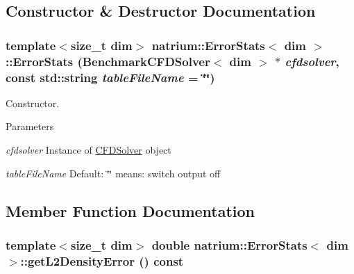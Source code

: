 \subsection{Constructor \& Destructor Documentation}
\hypertarget{classnatrium_1_1ErrorStats_a1dcdc9cb0508c7f64a067efae4134754}{
\subsubsection[{ErrorStats}]{\setlength{\rightskip}{0pt plus 5cm}template$<$size\_\-t dim$>$ {\bf natrium::ErrorStats}$<$ dim $>$::{\bf ErrorStats} ({\bf BenchmarkCFDSolver}$<$ dim $>$ $\ast$ {\em cfdsolver}, \/  const std::string {\em tableFileName} = {\ttfamily \char`\"{}\char`\"{}})}}
\label{classnatrium_1_1ErrorStats_a1dcdc9cb0508c7f64a067efae4134754}


Constructor. 
\begin{DoxyParams}{Parameters}
\item[{\em cfdsolver}]Instance of \hyperlink{classnatrium_1_1CFDSolver}{CFDSolver} object \item[{\em tableFileName}]Default: \char`\"{}\char`\"{} means: switch output off \end{DoxyParams}


\subsection{Member Function Documentation}
\hypertarget{classnatrium_1_1ErrorStats_a66f817c7daaf15724d5d42de4f17a1e8}{
\subsubsection[{getL2DensityError}]{\setlength{\rightskip}{0pt plus 5cm}template$<$size\_\-t dim$>$ double {\bf natrium::ErrorStats}$<$ dim $>$::getL2DensityError () const}}
\label{classnatrium_1_1ErrorStats_a66f817c7daaf15724d5d42de4f17a1e8}


